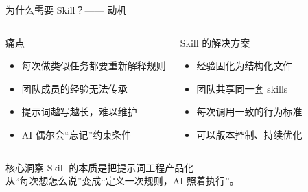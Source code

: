 \documentclass[aspectratio=169]{ctexbeamer}
\begin{document}
\begin{frame}{为什么需要 Skill？—— 动机}
\large

\begin{columns}[T]
\begin{block}{痛点}
\begin{itemize}
  \item 每次做类似任务都要\alert{重新解释规则}
  \item 团队成员的\alert{经验无法传承}
  \item 提示词越写越长，难以维护
  \item AI 偶尔会“忘记”约束条件
\end{itemize}
\end{block}

\begin{block}{Skill 的解决方案}
\begin{itemize}
  \item 经验\alert{固化}为结构化文件
  \item 团队\alert{共享}同一套 skills
  \item 每次调用\alert{一致}的行为标准
  \item 可以版本控制、持续优化
\end{itemize}
\end{block}
\end{columns}

\vspace{0.5cm}

\begin{alertblock}{核心洞察}
  Skill 的本质是\alert{把提示词工程产品化}——\\
  从“每次想怎么说”变成“定义一次规则，AI 照着执行”。
\end{alertblock}
\end{frame}
\end{document}
